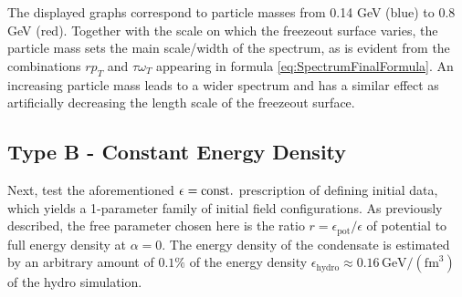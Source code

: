 The displayed graphs correspond to particle masses from 0.14 GeV (blue) to 0.8 GeV (red). Together with the scale on which the freezeout surface varies, the particle mass sets the main scale/width of the spectrum, as is evident from the combinations ${rp_T}$ and ${\tau\omega_T}$ appearing in formula \eqref{eq:SpectrumFinalFormula}. An increasing particle mass leads to a wider spectrum and has a similar effect as artificially decreasing the length scale of the freezeout surface.

\subsection{Type B - Constant Energy Density}

Next, test the aforementioned $\epsilon={\text{const.}}$ prescription of defining initial data, which yields a 1-parameter family of initial field configurations. As previously described, the free parameter chosen here is the ratio ${r=\epsilon_{\text{pot}}/\epsilon}$ of potential to full energy density at ${\alpha=0}$. The energy density of the condensate is estimated by an arbitrary amount of $0.1\%$ of the energy density ${\epsilon_{\text{hydro}}\approx 0.16\,\mathrm{GeV}/(\mathrm{fm}^3)}$  of the hydro simulation.\\
